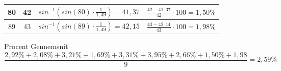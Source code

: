 \begin{table}[h]
\begin{tabular}{|c|c|c|c|}
        \hline
        80 & 42 & \begin{math}sin^{-1}(sin(80)\cdot \frac{1}{1,49}) = 41,37\end{math} & \begin{math}\frac{42 - 41,37}{42} \cdot 100 = 1,50\%\end{math}\\
        \hline
        89 & 43 & \begin{math}sin^{-1}(sin(89)\cdot \frac{1}{1,49}) = 42,15\end{math} & \begin{math}\frac{43 - 42,14}{43} \cdot 100 = 1,98\%\end{math}\\
        \hline
    \end{tabular}
\end{table}

Procent Gennemsnit
\begin{equation*}
    \frac{2,92\% + 2,08\% + 3,21\% + 1,69\% + 3,31\% + 3,95\% + 2,66\% + 1,50\% + 1,98}{9} = 2,59\%
\end{equation*}

